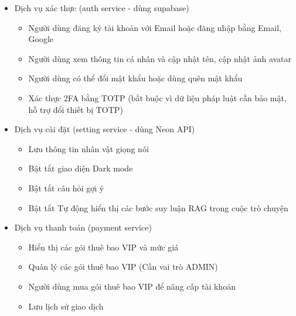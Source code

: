 \begin{itemize}

\item Dịch vụ xác thực (auth service - dùng supabase)
\begin{itemize}
\item Người dùng đăng ký tài khoản với Email hoặc đăng nhập bằng Email, Google
\item Người dùng xem thông tin cá nhân và cập nhật tên, cập nhật ảnh avatar
\item Người dùng có thể đổi mật khẩu hoặc dùng quên mật khẩu
\item Xác thực 2FA bằng TOTP (bắt buộc vì dữ liệu pháp luật cần bảo mật, hỗ trợ đổi thiết bị TOTP)
\end{itemize}
\item Dịch vụ cài đặt (setting service - dùng Neon API)
\begin{itemize}
\item Lưu thông tin nhân vật giọng nói
\item Bật tắt giao diện Dark mode
\item Bật tắt câu hỏi gợi ý
\item Bật tắt Tự động hiển thị các bước suy luận RAG trong cuộc trò chuyện
\end{itemize}
\item Dịch vụ thanh toán (payment service)
\begin{itemize}
\item Hiển thị các gói thuê bao VIP và mức giá

\item Quản lý các gói thuê bao VIP (Cần vai trò ADMIN)

\item Người dùng mua gói thuê bao VIP để nâng cấp tài khoản
\item Lưu lịch sử giao dịch

\end{itemize}
\end{itemize}
